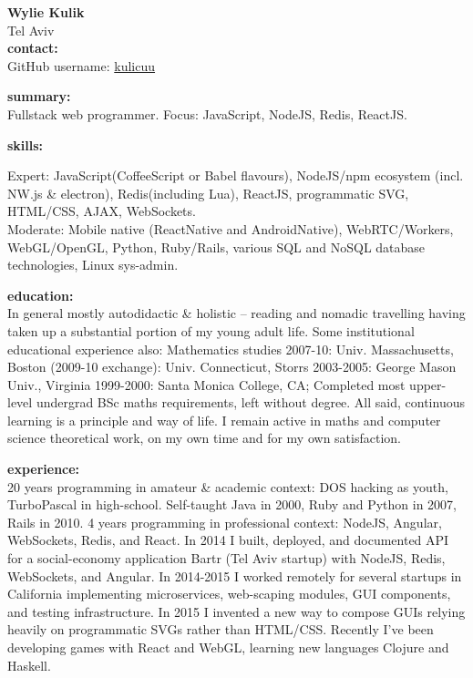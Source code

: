 



\normalFont \engrus
{\bf Wylie Kulik}
\\ Tel Aviv
\sectionSep
\\ {\bf contact:}
\\ GitHub username: \href{https://github.com/kulicuu}{kulicuu}

\sectionSep
{\bf summary:}
\\ Fullstack web programmer. Focus: JavaScript, NodeJS, Redis, ReactJS.

\sectionSep
{\bf skills:}

Expert: JavaScript(CoffeeScript or Babel flavours), NodeJS/npm ecosystem (incl. NW.js \& electron), Redis(including Lua), ReactJS, programmatic SVG, HTML/CSS, AJAX, WebSockets.
\\ Moderate: Mobile native (ReactNative and AndroidNative), WebRTC/Workers, WebGL/OpenGL, Python, Ruby/Rails, various SQL and NoSQL database technologies, Linux sys-admin.

\sectionSep
{\bf education:}
\\ In general mostly autodidactic \& holistic -- reading and nomadic travelling having taken up a substantial portion of my young adult life. Some institutional educational experience also: Mathematics studies 2007-10: Univ. Massachusetts, Boston (2009-10 exchange): Univ. Connecticut, Storrs 2003-2005: George Mason Univ., Virginia 1999-2000: Santa Monica College, CA; Completed most upper-level undergrad BSc maths requirements, left without degree. All said, continuous learning is a principle and way of life. I remain active in maths and computer science theoretical work, on my own time and for my own satisfaction.

\sectionSep
{\bf experience:}
\\ 20 years programming in amateur \& academic context: DOS hacking as youth, TurboPascal in high-school. Self-taught Java in 2000, Ruby and Python in 2007, Rails in 2010.
4 years programming in professional context: NodeJS, Angular, WebSockets, Redis, and React. In 2014 I built, deployed, and documented API for a social-economy application Bartr (Tel Aviv startup) with NodeJS, Redis, WebSockets, and Angular. In 2014-2015 I worked remotely for several startups in California implementing microservices, web-scaping modules, GUI components, and testing infrastructure. In 2015 I invented a new way to compose GUIs relying heavily on programmatic SVGs rather than HTML/CSS. Recently I've been developing games with React and WebGL, learning new languages Clojure and Haskell.




